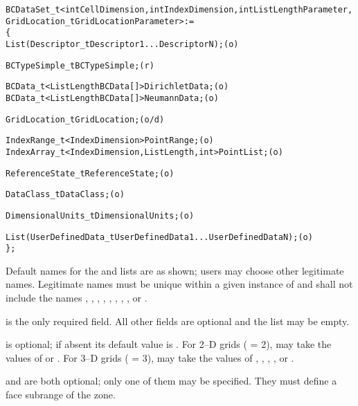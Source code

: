 \begin{alltt}
  BCDataSet\_t< int CellDimension, int IndexDimension, int ListLengthParameter,
                GridLocation\_t GridLocationParameter > :=
    \{
    List( Descriptor\_t Descriptor1 ... DescriptorN ) ;                      (o)

    BCTypeSimple\_t BCTypeSimple ;                                           (r)

    BCData\_t<ListLengthBCData[]> DirichletData ;                            (o)
    BCData\_t<ListLengthBCData[]> NeumannData ;                              (o)

    GridLocation\_t GridLocation ;                                           (o/d)

    IndexRange\_t<IndexDimension> PointRange ;                               (o)
    IndexArray\_t<IndexDimension, ListLength, int> PointList ;               (o)

    ReferenceState\_t ReferenceState ;                                       (o)

    DataClass\_t DataClass ;                                                 (o)
                
    DimensionalUnits\_t DimensionalUnits ;                                   (o)

    List( UserDefinedData\_t UserDefinedData1 ... UserDefinedDataN ) ;       (o)
    \} ;
\end{alltt}

\begin{notes}
\item Default names for the  and
       lists are as shown; users may choose other
      legitimate names.
      Legitimate names must be unique within a given instance
      of  and shall not include the names
      ,
      , , ,
      , , ,
      , or .
\item {} is the only required field.
      All other fields are optional and the  list
      may be empty.
\item {} is optional; if absent its default value is
      .  For 2--D grids ( = 2),
       may take the values of  or .
      For 3--D grids ( = 3),  may take the
      values of , , , ,
       or .
\item {} and  are both optional;
      only one of them may be specified.  They must define a face subrange of the zone.
\end{notes}

